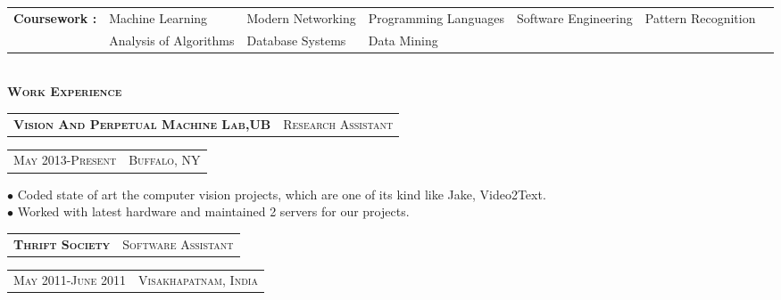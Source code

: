 \documentclass[10pt,letterpaper,oneside]{article}
\begin{document}
    \begin{tabular}{lllllll}
        \textbf{\footnotesize Coursework :}
        &{ \footnotesize Machine Learning }                 
        &{ \footnotesize Modern Networking }
        &{ \footnotesize Programming Languages } 
        &{ \footnotesize Software Engineering } 
        &{ \footnotesize Pattern Recognition }\\ 
        &
        { \footnotesize Analysis of Algorithms }
        &{ \footnotesize Database Systems }
        &{ \footnotesize Data Mining }
    \end{tabular}\\
    \textcolor{light-gray}{\textbf{\large W\textsc{ork} E\textsc{xperience}}}
    \vspace{4pt}\\
    \begin{tabular}{c|c}
        \textbf{\normalsize V\textsc{ision} A\textsc{nd} P\textsc{erpetual} M\textsc{achine} L\textsc{ab},UB}
        &\textmd{\normalsize R\textsc{esearch} A\textsc{ssistant}}
    \end{tabular}
    \hspace{1.71in}
    \textcolor{light-gray}{
        \begin{tabular}{c|c}
            {\small M\textsc{ay 2013}-P\textsc{resent}}
           &{\small B\textsc{uffalo}, NY}\\
        \end{tabular}
    } 
    \vspace{-4mm}
    \begin{adjustwidth}{7pt}{0pt}
        {\footnotesize $\bullet$ Coded state of art the computer vision projects, which are one of its kind like Jake, Video2Text.\\
        $\bullet$ Worked with latest hardware and maintained 2 servers for our projects. }\\
   \end{adjustwidth}
    \vspace{-2mm}
    \begin{tabular}{c|c}
        \textbf{\normalsize T\textsc{hrift} S\textsc{ociety}}
        &\textmd{\normalsize S\textsc{oftware} A\textsc{ssistant}}
    \end{tabular}
    \hspace{2.55in}
    \textcolor{light-gray}{
        \begin{tabular}{c|c}
            {\small M\textsc{ay 2011}-J\textsc{une 2011}}
            &{\small V\textsc{isakhapatnam}, I\textsc{ndia}}\\
        \end{tabular}
    } 
\end{document}
